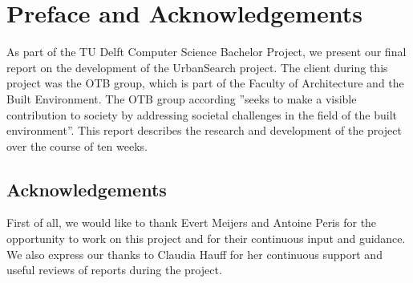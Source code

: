 \chapter*{Preface and Acknowledgements}
As part of the TU Delft Computer Science Bachelor Project, we present our final report on the development of the UrbanSearch project. The client during this project was the OTB group, which is part of the Faculty of Architecture and the Built Environment. The OTB group according ”seeks to make a visible contribution to society by addressing societal challenges in the field of the built environment”. This report describes the research and development of the project over the course of ten weeks.

\section*{Acknowledgements}
First of all, we would like to thank Evert Meijers and Antoine Peris for the opportunity to work on this project and for their continuous input and guidance. We also express our thanks to Claudia Hauff for her continuous support and useful reviews of reports during the project. 